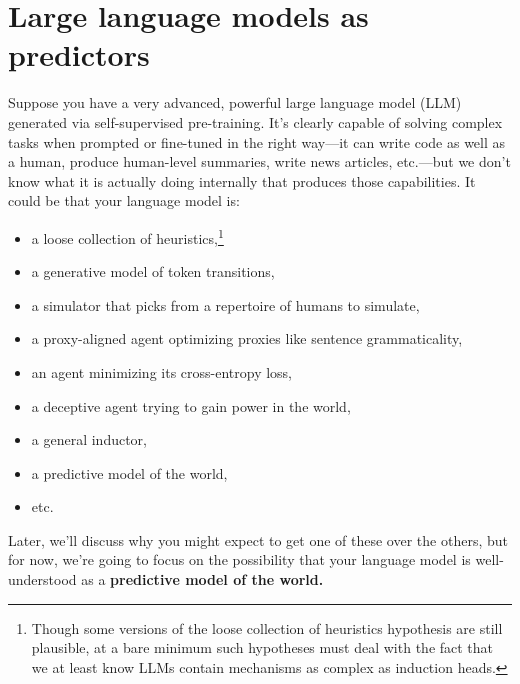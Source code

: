 \section{Large language models as predictors}
\label{sec:1}

Suppose you have a very advanced, powerful large language model (LLM) generated via self-supervised pre-training. It's clearly capable of solving complex tasks when prompted or fine-tuned in the right way---it can write code as well as a human, produce human-level summaries, write news articles, etc.---but we don't know what it is actually doing internally that produces those capabilities. It could be that your language model is:


\begin{itemize}
\item a loose collection of heuristics,\footnote{Though some versions of the loose collection of heuristics hypothesis are still plausible, at a bare minimum such hypotheses must deal with the fact that we at least know LLMs contain mechanisms as complex as induction heads\cite{TODO: cite https://transformer-circuits.pub/2022/in-context-learning-and-induction-heads/index.html}.}
\item a generative model of token transitions,
\item a simulator that picks from a repertoire of humans to simulate,
\item a proxy-aligned agent optimizing proxies like sentence grammaticality,
\item an agent minimizing its cross-entropy loss,
\item a deceptive agent trying to gain power in the world,
\item a general inductor,
\item a predictive model of the world,
\item etc.
\end{itemize}

Later\cite{TODO: cite https://www.alignmentforum.org/posts/qoHwKgLFfPcEuwaba/conditioning-predictive-models-making-inner-alignment-as}, we'll discuss why you might expect to get one of these over the others, but for now, we're going to focus on the possibility that your language model is well-understood as a \textbf{predictive model of the world.}

